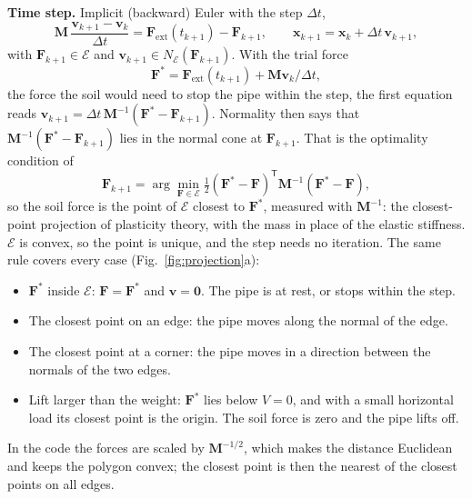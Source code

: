 \documentclass[11pt,a4paper]{article}
\begin{document}
\textbf{Time step.}  Implicit (backward) Euler with the step $\Delta t$,
\begin{equation}
  \mathbf{M}\,\frac{\mathbf{v}_{k+1} - \mathbf{v}_k}{\Delta t}
  = \mathbf{F}_\text{ext}(t_{k+1}) - \mathbf{F}_{k+1},
  \qquad
  \mathbf{x}_{k+1} = \mathbf{x}_k + \Delta t\,\mathbf{v}_{k+1},
  \label{eq:euler}
\end{equation}
with $\mathbf{F}_{k+1} \in \mathcal{E}$ and
$\mathbf{v}_{k+1} \in N_\mathcal{E}(\mathbf{F}_{k+1})$.  With the
trial force
\begin{equation}
  \mathbf{F}^* = \mathbf{F}_\text{ext}(t_{k+1})
  + \mathbf{M}\mathbf{v}_k/\Delta t,
\end{equation}
the force the soil would need to stop the pipe within the step, the
first equation reads
$\mathbf{v}_{k+1} = \Delta t\,\mathbf{M}^{-1}(\mathbf{F}^* - \mathbf{F}_{k+1})$.
Normality then says that $\mathbf{M}^{-1}(\mathbf{F}^* - \mathbf{F}_{k+1})$
lies in the normal cone at $\mathbf{F}_{k+1}$.  That is the optimality
condition of
\begin{equation}
  \mathbf{F}_{k+1} = \arg\min_{\mathbf{F} \in \mathcal{E}}
  \tfrac12 (\mathbf{F}^* - \mathbf{F})^\mathsf{T}
  \mathbf{M}^{-1} (\mathbf{F}^* - \mathbf{F}),
  \label{eq:projection}
\end{equation}
so the soil force is the point of $\mathcal{E}$ closest to
$\mathbf{F}^*$, measured with $\mathbf{M}^{-1}$: the closest-point
projection of plasticity theory, with the mass in place of the
elastic stiffness.  $\mathcal{E}$ is convex, so the point is unique,
and the step needs no iteration.  The same rule covers every case
(Fig.~\ref{fig:projection}a):
\begin{itemize}
  \item $\mathbf{F}^*$ inside $\mathcal{E}$: $\mathbf{F} = \mathbf{F}^*$
    and $\mathbf{v} = \mathbf{0}$.  The pipe is at rest, or stops
    within the step.
  \item The closest point on an edge: the pipe moves along the normal
    of the edge.
  \item The closest point at a corner: the pipe moves in a direction
    between the normals of the two edges.
  \item Lift larger than the weight: $\mathbf{F}^*$ lies below $V = 0$,
    and with a small horizontal load its closest point is the origin.
    The soil force is zero and the pipe lifts off.
\end{itemize}
In the code the forces are scaled by $\mathbf{M}^{-1/2}$, which makes
the distance Euclidean and keeps the polygon convex; the closest point
is then the nearest of the closest points on all edges.
\end{document}
